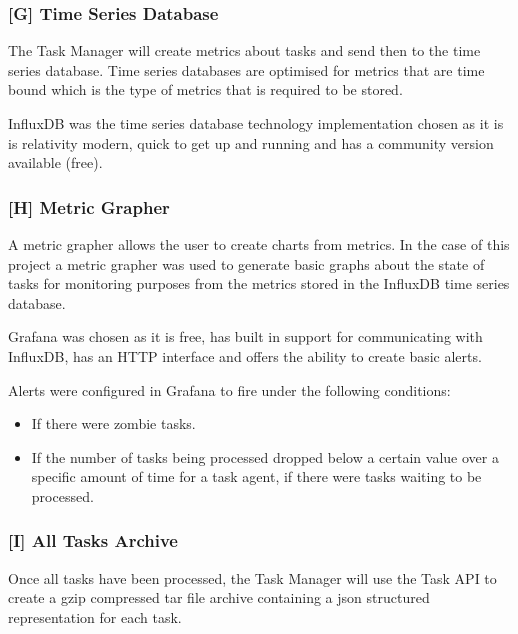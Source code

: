 \documentclass{mscreport}
\begin{document}
\subsubsection{[G] Time Series Database}

The Task Manager will create metrics about tasks and send then to the time series database. Time series databases are optimised for metrics that are time bound which is the type of metrics that is required to be stored. 

\vspace{0.3cm} \noindent
InfluxDB was the time series database technology implementation chosen as it is is relativity modern, quick to get up and running and has a community version available (free).

\subsubsection{[H] Metric Grapher}

A metric grapher allows the user to create charts from metrics. In the case of this project a metric grapher was used to generate basic graphs about the state of tasks for monitoring purposes from the metrics stored in the InfluxDB time series database.

\vspace{0.3cm} \noindent
Grafana was chosen as it is free, has built in support for communicating with InfluxDB, has an HTTP interface and offers the ability to create basic alerts.

\vspace{0.3cm} \noindent
Alerts were configured in Grafana to fire under the following conditions:

\begin{itemize}
	\setlength\itemsep{0.1em}
    \item If there were zombie tasks.
    \item If the number of tasks being processed dropped below a certain value over a specific amount of time for a task agent, if there were tasks waiting to be processed.
\end{itemize}

\subsubsection{[I] All Tasks Archive}

Once all tasks have been processed, the Task Manager will use the Task API to create a gzip compressed tar file archive containing a json structured representation for each task.
\end{document}
